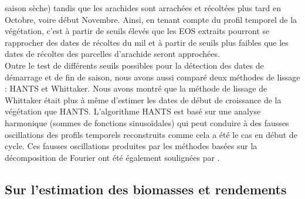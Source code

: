 saison sèche) tandis que les arachides sont arrachées et récoltées plus tard en Octobre, voire début Novembre. Ainsi, en tenant compte du profil temporel de la végétation, c’est à partir de seuils élevés que les EOS extraits pourront se rapprocher des dates de récoltes du mil et à partir de seuils plus faibles que les dates de récoltes des parcelles d’arachide seront approchées.
\\Outre le test de différents seuils possibles pour la détection des dates de démarrage et de fin de saison, nous avons aussi comparé deux méthodes de lissage : HANTS et Whittaker. Nous avons montré que la méthode de lissage de Whittaker était plus à même d’estimer les dates de début de croissance de la végétation que HANTS. L’algorithme HANTS est basé sur une analyse harmonique (sommes de fonctions sinusoïdales) qui peut conduire à des fausses oscillations des profils temporels reconstruits comme cela a été le cas en début de cycle. Ces fausses oscillations produites par les méthodes basées sur la décomposition de Fourier ont été également soulignées par \citet{Hermance2007, Lu2007,Roerink2000,Jonsson2002,Chen2004}.

\subsection{Sur l'estimation des biomasses et rendements}

